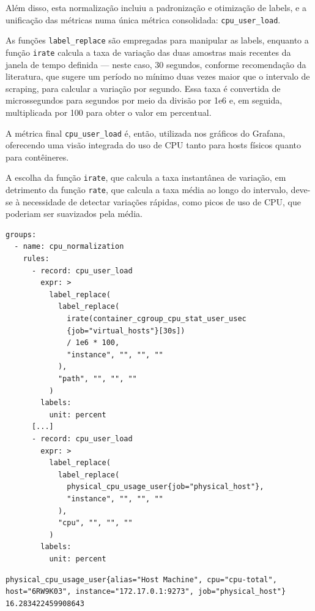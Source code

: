{Além disso, esta normalização incluiu a padronização e otimização de labels, e a unificação das métricas numa única métrica consolidada: \verb|cpu_user_load|.

As funções \verb|label_replace| são empregadas para manipular as labels, enquanto a função \verb|irate| calcula a taxa de variação das duas amostras mais recentes da janela de tempo definida --- neste caso, 30 segundos, conforme recomendação da literatura, que sugere um período no mínimo duas vezes maior que o intervalo de scraping, para calcular a variação por segundo. Essa taxa é convertida de microssegundos para segundos por meio da divisão por 1e6 e, em seguida, multiplicada por 100 para obter o valor em percentual.

A métrica final \verb|cpu_user_load| é, então, utilizada nos gráficos do Grafana, oferecendo uma visão integrada do uso de CPU tanto para hosts físicos quanto para contêineres.

A escolha da função \verb|irate|, que calcula a taxa instantânea de variação, em detrimento da função \verb|rate|, que calcula a taxa média ao longo do intervalo, deve-se à necessidade de detectar variações rápidas, como picos de uso de CPU, que poderiam ser suavizados pela média.

\begin{lstlisting}[caption={Arquivo cpu.yml}, label={lst:cpu_user_load}]
groups:
  - name: cpu_normalization
    rules:
      - record: cpu_user_load
        expr: >
          label_replace(
            label_replace(
              irate(container_cgroup_cpu_stat_user_usec
              {job="virtual_hosts"}[30s]) 
              / 1e6 * 100,
              "instance", "", "", ""
            ),
            "path", "", "", ""
          )
        labels:
          unit: percent
      [...]
      - record: cpu_user_load
        expr: >
          label_replace(
            label_replace(
              physical_cpu_usage_user{job="physical_host"},
              "instance", "", "", ""
            ),
            "cpu", "", "", ""
          )
        labels:
          unit: percent
\end{lstlisting}

\newpage

\begin{lstlisting}[caption={Métricas de CPU "Carga de usuário"\ pré-normalização}, label={lst:telegraf-cpu-user-load}]
  physical_cpu_usage_user{alias="Host Machine", cpu="cpu-total", host="6RW9K03", instance="172.17.0.1:9273", job="physical_host"}	16.283422459908643


\end{lstlisting}}
